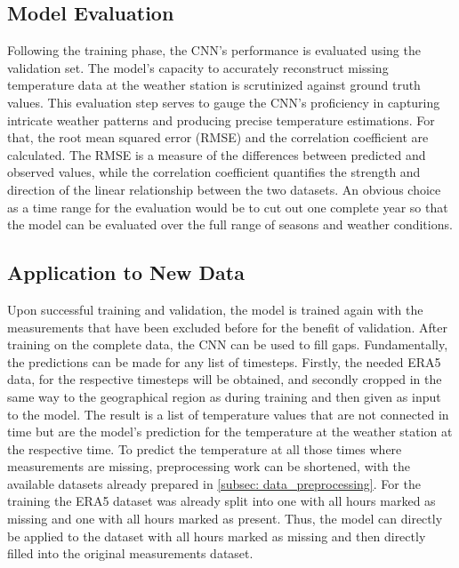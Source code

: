 \subsection{Model Evaluation}
Following the training phase, the CNN's performance is evaluated using the validation set.
The model's capacity to accurately reconstruct missing temperature data at the weather station is scrutinized against ground truth values.
This evaluation step serves to gauge the CNN's proficiency in capturing intricate weather patterns and producing precise temperature estimations.
For that, the root mean squared error (RMSE) and the correlation coefficient are calculated.
The RMSE is a measure of the differences between predicted and observed values, while the correlation coefficient quantifies the strength and direction of the linear relationship between the two datasets.
An obvious choice as a time range for the evaluation would be to cut out one complete year so that the model can be evaluated over the full range of seasons and weather conditions.

\subsection{Application to New Data}
Upon successful training and validation, the model is trained again with the measurements that have been excluded before for the benefit of validation.
After training on the complete data, the CNN can be used to fill gaps.
Fundamentally, the predictions can be made for any list of timesteps. Firstly, the needed ERA5 data, for the respective timesteps will be obtained, and secondly cropped in the same way to the geographical region as during training and then given as input to the model.
The result is a list of temperature values that are not connected in time but are the model's prediction for the temperature at the weather station at the respective time.
To predict the temperature at all those times where measurements are missing, preprocessing work can be shortened, with the available datasets already prepared in \ref{subsec: data_preprocessing}.
For the training the ERA5 dataset was already split into one with all hours marked as missing and one with all hours marked as present.
Thus, the model can directly be applied to the dataset with all hours marked as missing and then directly filled into the original measurements dataset.
